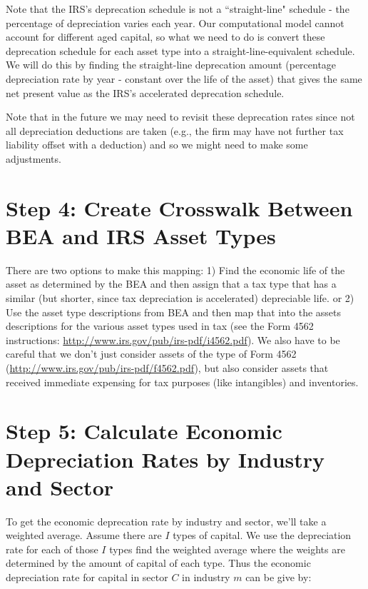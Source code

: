 \documentclass[article,11pt,letterpaper,fleqn]{article}
\theoremstyle{definition}
\numberwithin{equation}{section}
\begin{document}
Note that the IRS's deprecation schedule is not a ``straight-line" schedule - the percentage of depreciation varies each year.  Our computational model cannot account for different aged capital, so what we need to do is convert these deprecation schedule for each asset type into a straight-line-equivalent schedule.  We will do this by finding the straight-line deprecation amount (percentage depreciation rate by year - constant over the life of the asset) that gives the same net present value as the IRS's accelerated deprecation schedule.

Note that in the future we may need to revisit these deprecation rates since not all depreciation deductions are taken (e.g., the firm may have not further tax liability offset with a deduction) and so we might need to make some adjustments. 


\section*{Step 4: Create Crosswalk Between BEA and IRS Asset Types}
\label{sec:step4}

There are two options to make this mapping: 1) Find the economic life of the asset as determined by the BEA and then assign that a tax type that has a similar (but shorter, since tax depreciation is accelerated) depreciable life. or 2) Use the asset type descriptions from BEA and then map that into the assets descriptions for the various asset types used in tax (see the Form 4562 instructions: \url{http://www.irs.gov/pub/irs-pdf/i4562.pdf}).  We also have to be careful that we don't just consider assets of the type of Form 4562 (\url{http://www.irs.gov/pub/irs-pdf/f4562.pdf}), but also consider assets that received immediate expensing for tax purposes (like intangibles) and inventories.

\section*{Step 5: Calculate Economic Depreciation Rates by Industry and Sector}
\label{sec:step5}

To get the economic deprecation rate by industry and sector, we'll take a weighted average.  Assume there are $I$ types of capital.  We use the depreciation rate for each of those $I$ types find the weighted average where the weights are determined by the amount of capital of each type.  Thus the economic depreciation rate for capital in sector $C$ in industry $m$ can be give by:
\end{document}
